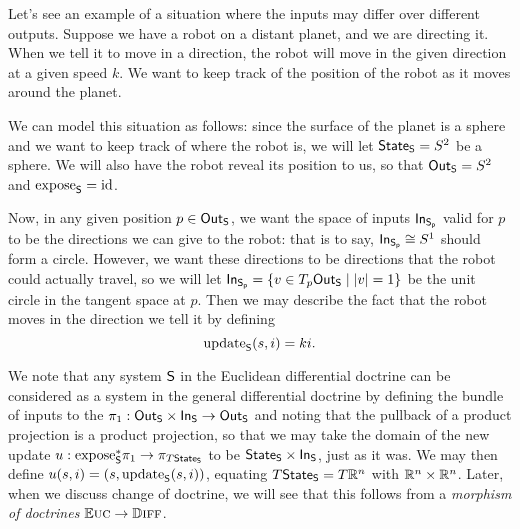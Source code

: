 \documentclass[DynamicalBook]{subfiles}
\begin{document}
\begin{example}
Let's see an example of a situation where the inputs may differ over different
outputs. Suppose we have a robot on a distant planet, and we are directing it.
When we tell it to move in a direction, the robot will move in the given
direction at a given speed $k$. We want to keep
track of the position of the robot as it moves around the planet.

We can model this situation as follows: since the surface of the planet is a
sphere and we want to keep track of where the robot is, we will let $\mathsf{State}_{\mathsf{S}} =
S^2$ be a sphere. We will also have the robot reveal its position to us, so that
$\mathsf{Out}_{\mathsf{S}} = S^2$ and $\mathrm{expose}_{\mathsf{S}} = \mathrm{id}$.

Now, in any given position $p \in \mathsf{Out}_{\mathsf{S}}$, we want the space of inputs
$\mathsf{In}_{\mathsf{S_p}}$ valid for $p$ to be the directions we can give to the robot: that is
to say, $\mathsf{In}_{\mathsf{S_p}} \cong S^1$ should form a circle. However, we want these
directions to be directions that the robot could actually travel, so we will let
$\mathsf{In}_{\mathsf{S_p}} = \{v \in T_p \mathsf{Out}_{\mathsf{S}}\mid |v| = 1\}$ be the unit circle in the tangent
space at $p$. Then we may describe the fact that the robot moves in the
direction we tell it by defining
$$\mathrm{update}_{\mathsf{S}}(s, i) = ki.$$
\end{example}

We note that any system $\mathsf{S}$ in the Euclidean differential doctrine can be
considered as
a system in the general differential doctrine by defining the bundle of inputs
to the $\pi_1 : \mathsf{Out}_{\mathsf{S}} \times \mathsf{In}_{\mathsf{S}} \to \mathsf{Out}_{\mathsf{S}}$ and noting that the pullback
of a product projection is a product projection, so that we may take the domain
of the new update $u : \mathrm{expose}_{\mathsf{S}}^{\ast} \pi_1 \to \pi_{T\mathsf{State}_{\mathsf{S}}}$ to be
$\mathsf{State}_{\mathsf{S}} \times \mathsf{In}_{\mathsf{S}}$, just as it was. We may then define $u(s, i) = (s,
\mathrm{update}_{\mathsf{S}}(s, i))$, equating $T\mathsf{State}_{\mathsf{S}} = T\mathbb{R}^n$ with $\mathbb{R}^n \times \mathbb{R}^n$.
Later, when we discuss change of doctrine, we will see that this follows from a
\emph{morphism of doctrines} $\mathbb{E}\textsc{uc} \to \mathbb{D}\textsc{iff}$.
\end{document}

